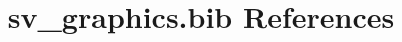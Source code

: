 \documentclass[12pt]{article}
\begin{document}
\nocite{*}
\title{sv\_graphics.bib References}
\maketitle

%



\end{document}
